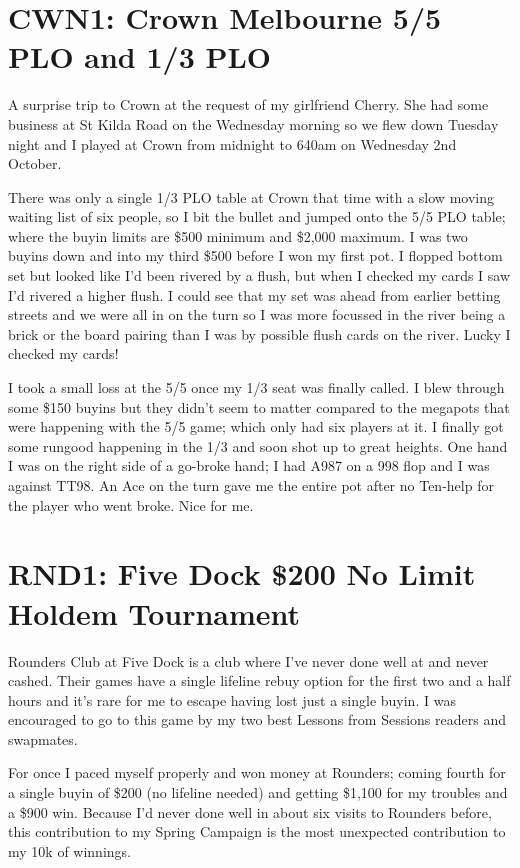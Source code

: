 \section*{CWN1: Crown Melbourne 5/5 PLO and 1/3 PLO}

A surprise trip to Crown at the request of my girlfriend Cherry. She
had some business at St Kilda Road on the Wednesday morning so we flew
down Tuesday night and I played at Crown from midnight to 640am on
Wednesday 2nd October.

There was only a single 1/3 PLO table at Crown that time with a slow
moving waiting list of six people, so I bit the bullet and jumped onto
the 5/5 PLO table; where the buyin limits are \$500 minimum and
\$2,000 maximum. I was two buyins down and into my third \$500 before
I won my first pot. I flopped bottom set but looked like I'd been
rivered by a flush, but when I checked my cards I saw I'd rivered a
higher flush. I could see that my set was ahead from earlier betting
streets and we were all in on the turn so I was more focussed in the
river being a brick or the board pairing than I was by possible flush
cards on the river. Lucky I checked my cards!

I took a small loss at the 5/5 once my 1/3 seat was finally called. I
blew through some \$150 buyins but they didn't seem to matter compared
to the megapots that were happening with the 5/5 game; which only had
six players at it. I finally got some rungood happening in the 1/3 and
soon shot up to great heights. One hand I was on the right side of a
go-broke hand; I had A987 on a 998 flop and I was against TT98. An Ace
on the turn gave me the entire pot after no Ten-help for the player
who went broke. Nice for me.

\section*{RND1: Five Dock \$200 No Limit Holdem Tournament}

Rounders Club at Five Dock is a club where I've never done well at and
never cashed. Their games have a single lifeline rebuy option for the
first two and a half hours and it's rare for me to escape having lost
just a single buyin. I was encouraged to go to this game by my two
best Lessons from Sessions readers and swapmates.

For once I paced myself properly and won money at Rounders; coming
fourth for a single buyin of \$200 (no lifeline needed) and getting
\$1,100 for my troubles and a \$900 win. Because I'd never done well
in about six visits to Rounders before, this contribution to my Spring
Campaign is the most unexpected contribution to my 10k of winnings.

